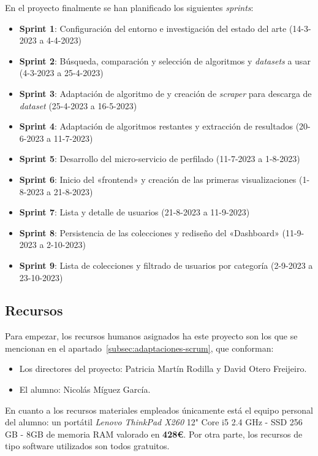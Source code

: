En el proyecto finalmente se han planificado los siguientes \textit{sprints}:
\begin{itemize}
    \item \textbf{Sprint 1}: Configuración del entorno e investigación del estado del arte (14-3-2023 a 4-4-2023)
    \item \textbf{Sprint 2}: Búsqueda, comparación y selección de algoritmos y \textit{datasets} a usar (4-3-2023 a 25-4-2023)
    \item \textbf{Sprint 3}: Adaptación de algoritmo de \citet{loscalis22} y creación de \textit{scraper} para descarga de \textit{dataset} (25-4-2023 a 16-5-2023)
    \item \textbf{Sprint 4}: Adaptación de algoritmos restantes y extracción de resultados (20-6-2023 a 11-7-2023)
    \item \textbf{Sprint 5}: Desarrollo del micro-servicio de perfilado (11-7-2023 a 1-8-2023)
    \item \textbf{Sprint 6}: Inicio del «frontend» y creación de las primeras visualizaciones (1-8-2023 a 21-8-2023)
    \item \textbf{Sprint 7}: Lista y detalle de usuarios (21-8-2023 a 11-9-2023)
    \item \textbf{Sprint 8}: Persistencia de las colecciones y rediseño del «Dashboard» (11-9-2023 a 2-10-2023)
    \item \textbf{Sprint 9}: Lista de colecciones y filtrado de usuarios por categoría (2-9-2023 a 23-10-2023)
\end{itemize}

\subsection{Recursos}
Para empezar, los recursos humanos asignados ha este proyecto son los que se mencionan en el apartado~\ref{subsec:adaptaciones-scrum}, que conforman:

\begin{itemize}
    \item Los directores del proyecto: Patricia Martín Rodilla y David Otero Freijeiro.
    \item El alumno: Nicolás Míguez García.
\end{itemize}

En cuanto a los recursos materiales empleados únicamente está el equipo personal del alumno: un portátil \textit{Lenovo ThinkPad X260} 12" Core i5 2.4 GHz - SSD 256 GB - 8GB de memoria RAM valorado en \textbf{428€}. Por otra parte, los recursos de tipo software utilizados son todos gratuitos.

